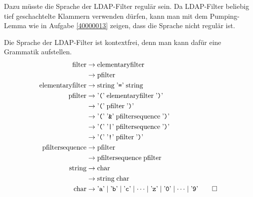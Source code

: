 \begin{loesung}
\begin{teilaufgaben}
\item
Dazu müsste die Sprache der LDAP-Filter regulär sein.
Da LDAP-Filter beliebig tief geschachtelte Klammern verwenden dürfen,
kann man mit dem Pumping-Lemma wie in Aufgabe \ref{40000013} zeigen,
dass die Sprache nicht regulär ist.
\item
Die Sprache der LDAP-Filter ist kontextfrei, denn man kann dafür
eine Grammatik aufstellen.
\begin{align*}
\text{filter}
        &\rightarrow\text{elementaryfilter}\\
        &\rightarrow\text{pfilter}\\
\text{elementaryfilter}
        &\rightarrow \text{string} \;\text{'{\tt =}'}\; \text{string}\\
\text{pfilter}
        &\rightarrow \text{'{\tt (}'}\;\text{elementaryfilter}\;\text{'{\tt )}'} \\
        &\rightarrow \text{'{\tt (}'}\;\text{pfilter}\;\text{'{\tt )}'} \\
        &\rightarrow \text{'{\tt (}'}\; \text{'{\tt \&}'}\;
                \text{pfiltersequence}\;\text{'{\tt )}'} \\
        &\rightarrow \text{'{\tt (}'}\; \text{'{\tt |}'}\;
                \text{pfiltersequence}\;\text{'{\tt )}'} \\
        &\rightarrow \text{'{\tt (}'}\; \text{'{\tt !}'}\;
                \text{pfilter}\;\text{'{\tt )}'} \\
\text{pfiltersequence}
        &\rightarrow \text{pfilter}\\
        &\rightarrow \text{pfiltersequence}\;\text{pfilter}\\
\text{string}
        &\rightarrow \text{char}\\
        &\rightarrow \text{string} \; \text{char}\\
\text{char}
        &\rightarrow
\text{'{\tt a}'}\mid 
\text{'{\tt b}'}\mid 
\text{'{\tt c}'}\mid \dots\mid 
\text{'{\tt z}'}\mid 
\text{'{\tt 0}'}\mid \dots\mid 
\text{'{\tt 9}'}
\qedhere
\end{align*}
\end{teilaufgaben}
\end{loesung}


